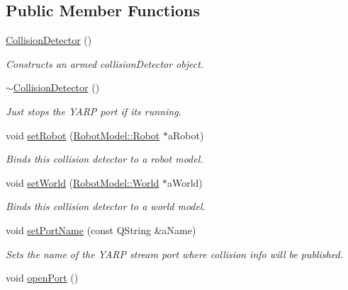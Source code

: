 \subsection*{Public Member Functions}
\begin{DoxyCompactItemize}
\item 
\hyperlink{class_collision_detector_ab3f66bd8d272a21674e38bf46d4d31e0}{CollisionDetector} ()
\begin{DoxyCompactList}\small\item\em Constructs an armed collisionDetector object. \item\end{DoxyCompactList}\item 
\hyperlink{class_collision_detector_a1a0f7a386920e0cf83a101be92f04598}{$\sim$CollisionDetector} ()
\begin{DoxyCompactList}\small\item\em Just stops the YARP port if its running. \item\end{DoxyCompactList}\item 
void \hyperlink{class_collision_detector_a2c768facee0187d691dcc268b91d9652}{setRobot} (\hyperlink{class_robot_model_1_1_robot}{RobotModel::Robot} $\ast$aRobot)
\begin{DoxyCompactList}\small\item\em Binds this collision detector to a robot model. \item\end{DoxyCompactList}\item 
void \hyperlink{class_collision_detector_a7490b9d8f95f73b55b3add14ea58a737}{setWorld} (\hyperlink{class_robot_model_1_1_world}{RobotModel::World} $\ast$aWorld)
\begin{DoxyCompactList}\small\item\em Binds this collision detector to a world model. \item\end{DoxyCompactList}\item 
void \hyperlink{class_collision_detector_acd233230c6fd897f206e1fe016b7521d}{setPortName} (const QString \&aName)
\begin{DoxyCompactList}\small\item\em Sets the name of the YARP stream port where collision info will be published. \item\end{DoxyCompactList}\item 
void \hyperlink{class_collision_detector_a1fa9e503fff5d46bd3b068dc8cd98fe4}{openPort} ()

\end{DoxyCompactItemize}
